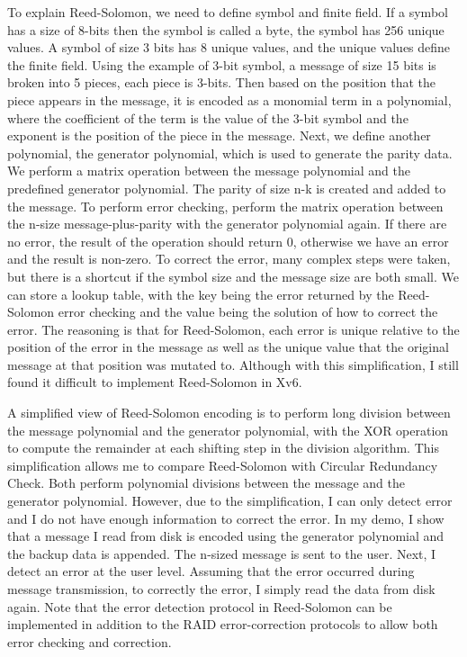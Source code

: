 To explain Reed-Solomon, we need to define symbol and finite field. If a symbol has a size of 8-bits then the symbol is called a byte, the symbol has 256 unique values. A symbol of size 3 bits has 8 unique values, and the unique values define the finite field. Using the example of 3-bit symbol, a message of size 15 bits is broken into 5 pieces, each piece is 3-bits. Then based on the position that the piece appears in the message, it is encoded as a monomial term in a polynomial, where the coefficient of the term is the value of the 3-bit symbol and the exponent is the position of the piece in the message. Next, we define another polynomial, the generator polynomial, which is used to generate the parity data. We perform a matrix operation between the message polynomial and the predefined generator polynomial. The parity of size n-k is created and added to the message. To perform error checking, perform the matrix operation between the n-size message-plus-parity with the generator polynomial again. If there are no error, the result of the operation should return 0, otherwise we have an error and the result is non-zero. To correct the error, many complex steps were taken, but there is a shortcut if the symbol size and the message size are both small. We can store a lookup table, with the key being the error returned by the Reed-Solomon error checking and the value being the solution of how to correct the error. The reasoning is that for Reed-Solomon, each error is unique relative to the position of the error in the message as well as the unique value that the original message at that position was mutated to. Although with this simplification, I still found it difficult to implement Reed-Solomon in Xv6.

A simplified view of Reed-Solomon encoding is to perform long division between the message polynomial and the generator polynomial, with the XOR operation to compute the remainder at each shifting step in the division algorithm. This simplification allows me to compare Reed-Solomon with Circular Redundancy Check. Both perform polynomial divisions between the message and the generator polynomial. However, due to the simplification, I can only detect error and I do not have enough information to correct the error. In my demo, I show that a message I read from disk is encoded using the generator polynomial and the backup data is appended. The n-sized message is sent to the user. Next, I detect an error at the user level. Assuming that the error occurred during message transmission, to correctly the error, I simply read the data from disk again. Note that the error detection protocol in Reed-Solomon can be implemented in addition to the RAID error-correction protocols to allow both error checking and correction. 

